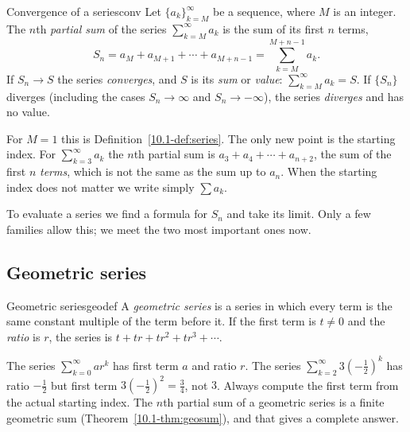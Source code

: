 \documentclass[11pt]{article}
\begin{document}
\begin{defn}{Convergence of a series}{conv}
Let $\{a_k\}_{k=M}^\infty$ be a sequence, where $M$ is an integer. The $n$th \emph{partial sum} of the series $\sum_{k=M}^\infty a_k$ is the sum of its first $n$ terms,
\[
S_n=a_M+a_{M+1}+\cdots+a_{M+n-1}=\sum_{k=M}^{M+n-1}a_k .
\]
If $S_n\to S$ the series \emph{converges}, and $S$ is its \emph{sum} or \emph{value}: $\sum_{k=M}^\infty a_k=S$. If $\{S_n\}$ diverges (including the cases $S_n\to\infty$ and $S_n\to-\infty$), the series \emph{diverges} and has no value.
\end{defn}

For $M=1$ this is Definition~\ref{10.1-def:series}. The only new point is the starting index. For $\sum_{k=3}^\infty a_k$ the $n$th partial sum is $a_3+a_4+\cdots+a_{n+2}$, the sum of the first $n$ \emph{terms}, which is not the same as the sum up to $a_n$. When the starting index does not matter we write simply $\sum a_k$.

To evaluate a series we find a formula for $S_n$ and take its limit. Only a few families allow this; we meet the two most important ones now.

\subsection*{Geometric series}

\begin{defn}{Geometric series}{geodef}
A \emph{geometric series} is a series in which every term is the same constant multiple of the term before it. If the first term is $t\ne0$ and the \emph{ratio} is $r$, the series is $t+tr+tr^2+tr^3+\cdots$.
\end{defn}

The series $\sum_{k=0}^\infty ar^k$ has first term $a$ and ratio $r$. The series $\sum_{k=2}^\infty3\left(-\frac12\right)^k$ has ratio $-\frac12$ but first term $3\left(-\frac12\right)^2=\frac34$, not $3$. Always compute the first term from the actual starting index. The $n$th partial sum of a geometric series is a finite geometric sum (Theorem~\ref{10.1-thm:geosum}), and that gives a complete answer.
\end{document}

